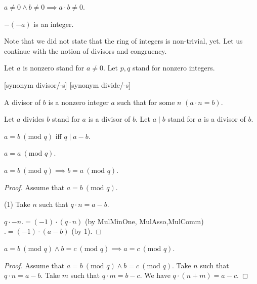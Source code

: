 \documentclass{article}
\renewcommand{\mod}{\text{mod }}
\begin{document}
  \begin{forthel}
    \begin{axiom}[ZeroDiv]
      $a \neq 0 \wedge b \neq 0 \implies a \cdot b \neq 0$.
    \end{axiom}

    \begin{lemma}
      $-(-a)$ is an integer.
    \end{lemma}
  \end{forthel}

Note that we did not state that the ring of integers is non-trivial, yet. Let us continue with the notion of divisors and congruency.

  \begin{forthel}
    Let $a$ is nonzero stand for $a \neq 0$.
    Let $p,q$ stand for nonzero integers.

    [synonym divisor/-s] [synonym divide/-s]

    \begin{definition}[Divisor]
      A divisor of $b$ is a nonzero integer $a$ such that for some $n$ $(a \cdot n = b)$.
    \end{definition}

    Let $a$ divides $b$ stand for $a$ is a divisor of $b$.
    Let $a \mid b$ stand for $a$ is a divisor of $b$.

    \begin{definition}[EquMod]
      $a = b ~(\mod q)$ iff $q \mid a-b$.
    \end{definition}

    \begin{lemma}[EquModRef]
      $a = a ~(\mod q)$.
    \end{lemma}

    \begin{lemma}[EquModSym]
      $a = b ~(\mod q) \implies b = a ~(\mod q)$.
    \end{lemma}
    \begin{proof}
      Assume that $a = b ~(\mod q)$.

      (1) Take $n$ such that $q \cdot n = a - b$.

      $q \cdot -n .= (-1) \cdot (q \cdot n)$ (by MulMinOne, MulAsso,MulComm) $.= (-1) \cdot (a - b)$ (by 1).
    \end{proof}

    \begin{lemma}[EquModTrn]
      $a = b ~(\mod q) \wedge b = c ~(\mod q) \implies a = c ~(\mod q)$.
    \end{lemma}
    \begin{proof}
      Assume that $a = b ~(\mod q) \wedge b = c ~(\mod q)$. Take $n$ such that $q \cdot n = a - b$. Take $m$ such that $q \cdot m = b - c$. We have $q \cdot (n + m) = a - c$.
    \end{proof}


\end{forthel}
\end{document}
